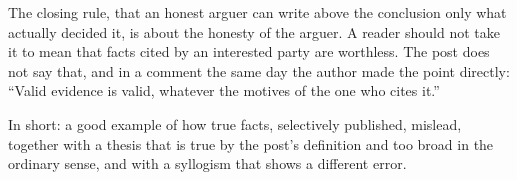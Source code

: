 \begin{afterword}
The closing rule, that an honest arguer can write above the conclusion only what actually decided it, is about the honesty of the arguer. A reader should not take it to mean that facts cited by an interested party are worthless. The post does not say that, and in a comment the same day the author made the point directly: ``Valid evidence is valid, whatever the motives of the one who cites it.''

In short: a good example of how true facts, selectively published, mislead, together with a thesis that is true by the post's definition and too broad in the ordinary sense, and with a syllogism that shows a different error.
\end{afterword}
